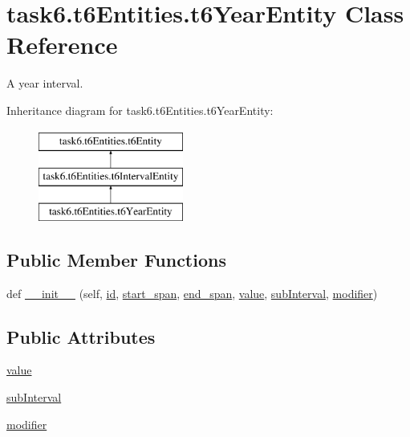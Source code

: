 \hypertarget{classtask6_1_1t6Entities_1_1t6YearEntity}{}\section{task6.\+t6\+Entities.\+t6\+Year\+Entity Class Reference}
\label{classtask6_1_1t6Entities_1_1t6YearEntity}


A year interval.  


Inheritance diagram for task6.\+t6\+Entities.\+t6\+Year\+Entity\+:\begin{figure}[H]
\begin{center}
\leavevmode
\includegraphics[height=3.000000cm]{classtask6_1_1t6Entities_1_1t6YearEntity}
\end{center}
\end{figure}
\subsection*{Public Member Functions}
\begin{DoxyCompactItemize}
\item 
def \hyperlink{classtask6_1_1t6Entities_1_1t6YearEntity_af389e21f4110a6b6195b48c813fc2a8c}{\+\_\+\+\_\+init\+\_\+\+\_\+} (self, \hyperlink{classtask6_1_1t6Entities_1_1t6Entity_a96b2e7fb553c920ab2db6f6deb31e3b4}{id}, \hyperlink{classtask6_1_1t6Entities_1_1t6Entity_a8221c36d2995a24200cdfbd74cc9233c}{start\+\_\+span}, \hyperlink{classtask6_1_1t6Entities_1_1t6Entity_a597d42bb02fc9f42277098f0ce21917c}{end\+\_\+span}, \hyperlink{classtask6_1_1t6Entities_1_1t6YearEntity_a25144794aa5738b27d98582006721739}{value}, \hyperlink{classtask6_1_1t6Entities_1_1t6YearEntity_a2bbf91472cef4f79b2b2fc99dd614976}{sub\+Interval}, \hyperlink{classtask6_1_1t6Entities_1_1t6YearEntity_a708f1ef10aa9dab2ab919c22cbb43952}{modifier})
\end{DoxyCompactItemize}
\subsection*{Public Attributes}
\begin{DoxyCompactItemize}
\item 
\hyperlink{classtask6_1_1t6Entities_1_1t6YearEntity_a25144794aa5738b27d98582006721739}{value}
\item 
\hyperlink{classtask6_1_1t6Entities_1_1t6YearEntity_a2bbf91472cef4f79b2b2fc99dd614976}{sub\+Interval}
\item 
\hyperlink{classtask6_1_1t6Entities_1_1t6YearEntity_a708f1ef10aa9dab2ab919c22cbb43952}{modifier}
\end{DoxyCompactItemize}


